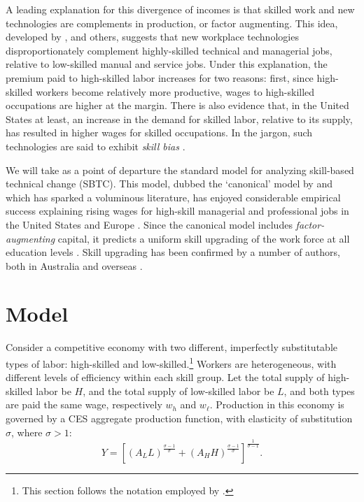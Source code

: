         
        

A leading explanation for this divergence of incomes is that skilled work and new technologies are complements in production, or factor augmenting. This idea, developed by \citet{Tinbergen1974}, \citet{Katz1992} and others, suggests that new workplace technologies disproportionately complement highly-skilled technical and managerial jobs, relative to low-skilled manual and service jobs. Under this explanation, the premium paid to high-skilled labor increases for two reasons: first, since high-skilled workers become relatively more productive, wages to high-skilled occupations are higher at the margin. There is also evidence that, in the United States at least, an increase in the demand for skilled labor, relative to its supply, has resulted in higher wages for skilled occupations. In the jargon, such technologies are said to exhibit \emph{skill bias} \citep{Autor2006}.

We will take as a point of departure the standard model for analyzing skill-based technical change (SBTC). This model, dubbed the `canonical' model by \citet{Acemoglu2011} and which has sparked a voluminous literature, has enjoyed considerable empirical success explaining rising wages for high-skill managerial and professional jobs in the United States and Europe \citep{Katz1992}. Since the canonical model includes \emph{factor-augmenting} capital, it predicts a uniform skill upgrading of the work force at all education levels \citep{Levy2003}. Skill upgrading has been confirmed by a number of authors, both in Australia \citep{Esposto2012, Wooden2000, Cully1999} and overseas \citep{Autor2008}. 

\section{Model}

Consider a competitive economy with two different, imperfectly substitutable types of labor: high-skilled and low-skilled.\footnote{This section follows the notation employed by \citet{Acemoglu2011}.} Workers are heterogeneous, with different levels of efficiency within each skill group. Let the total supply of high-skilled labor be $H$, and the total supply of low-skilled labor be $L$, and both types are paid the same wage, respectively $w_h$ and $w_\ell$. Production in this economy is governed by a CES aggregate production function, with elasticity of substitution $\sigma$, where $\sigma>1$:
\begin{equation}  \label{eq:prod}
Y = \left[
  \left(A_LL \right)^\frac{\sigma-1}{\sigma}
  +
  \left(A_HH \right)^\frac{\sigma-1}{\sigma}
  \right]^\frac{1}{\sigma-1}.
\end{equation}

